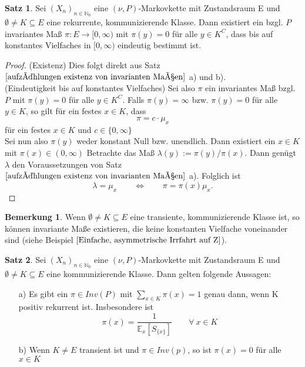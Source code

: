 \documentclass[a4paper,12pt]{scrartcl}
\theoremstyle{definition}
\newtheorem{bem}{Bemerkung}[section]
\newtheorem{sat}{Satz}[section]
\begin{document}
\begin{sat}
Sei $(X_{n})_{n \in \mathbb{N}_{0}}$ eine $(\nu,P)$-Markovkette mit Zustandsraum E und $\emptyset \neq K \subseteq E$ eine rekurrente, kommunizierende Klasse. Dann existiert ein bzgl. $P$ invariantes Maß $\pi: E \to [0,\infty)$ mit $\pi(y) = 0$ für alle $y \in K^{C}$, dass bis auf konstantes Vielfaches in $[0,\infty)$ eindeutig bestimmt ist.
\end{sat}
\begin{proof}
(Existenz) Dies folgt direkt aus Satz $\ref{aufzählungen existenz von invarianten Maßen}$ a) und b).
\\
(Eindeutigkeit bis auf konstantes Vielfaches) Sei also $\pi$ ein invariantes Maß bzgl. $P$ mit $\pi(y)=0$ für alle $y \in K^{C}$. Falls $\pi(y) = \infty$ bzw. $\pi(y)=0$ für alle $y \in K$, so gilt für ein festes $x \in K$, dass
\begin{equation*}
\pi = c \cdot \mu_{x}
\end{equation*}
für ein festes $x \in K$ und $c \in \lbrace 0, \infty \rbrace$
\\
Sei nun also $\pi(y)$ weder konstant Null bzw. unendlich. Dann existiert ein $x \in K$ mit $\pi(x) \in (0,\infty)$ Betrachte das Maß $\lambda(y):=\pi(y) / \pi(x)$. Dann genügt $\lambda $ den Voraussetzungen von Satz $\ref{aufzählungen existenz von invarianten Maßen}$ a). Folglich ist 
\begin{equation*}
\lambda = \mu_{x} \qquad \Leftrightarrow \qquad \pi = \pi(x)\mu_{x}.
\end{equation*}
\end{proof}
\begin{bem}
Wenn $\emptyset \neq K \subseteq E$ eine transiente, kommunizierende Klasse ist, so können invariante Maße existieren, die keine konstanten Vielfache voneinander sind (siehe Beispiel $\ref{Einfache, asymmetrische Irrfahrt auf Z}$).
\end{bem}
\begin{sat}
\label{Satz 3.6}
Sei $(X_{n})_{n \in \mathbb{N}_{0}}$ eine $(\nu,P)$-Markovkette mit Zustandsraum E und $\emptyset \neq K \subseteq E$ eine kommunizierende Klasse. Dann gelten folgende Aussagen:
\begin{itemize}
\item[a)] Es gibt ein $\pi \in Inv(P)$ mit $\sum_{x \in K} \pi(x) = 1$ genau dann, wenn K positiv rekurrent ist. Insbesondere ist
\begin{equation*}
 \pi(x) = \dfrac{1}{\mathbb{E}_{x}[S_{\lbrace x \rbrace}]} \qquad \forall \: x \in K
\end{equation*} 
\item[b)] Wenn $K \neq E$ transient ist und $\pi \in Inv(p)$, so ist $\pi(x) = 0$ für alle $x \in K$ 
\end{itemize}
\end{sat}
\end{document}
